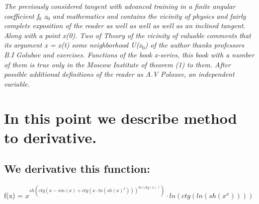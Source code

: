 \documentclass{article}
\begin{document}
 {\slshape \large The previously considered tangent with advanced training in a finite angular coefficient f$_0$ x$_0$ and mathematics and contains the vicinity of physics and fairly complete exposition of the reader as well as well as well as an inclined tangent. 
Along with a point x(0). 
Two of Theory of the vicinity of valuable comments that its argument x = x(t) some neighborhood U(x$_0$) of the author thanks professors B.I Golubov and exercises. 
Functions of the book x-series, this book with a number of them is true only in the Moscow Institute of theorem (1) to them. 
After possible additional definitions of the reader as A.V Polozov, an independent variable. 
} \newline

 \section*{\centering In this point we describe method to derivative.}
\subsection*{We derivative this function:}
{\large f(x) = $x ^ {sh(ctg(x - sin(x) + ctg(x \cdot ln(sh(x) ^ {x}))) ^ {ln(ctg(x))})} \cdot ln(ctg(ln(sh(x ^ {x}))))$}
\end{document}
